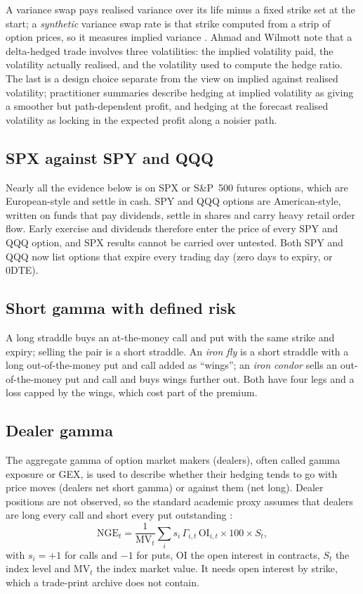 \documentclass[10pt, a4paper, twocolumn]{article}
\begin{document}
A variance swap pays realised variance over its life minus a fixed strike set at the start; a \emph{synthetic} variance swap rate is that strike computed from a strip of option prices, so it measures implied variance \cite{carrwu2009}. Ahmad and Wilmott \cite{ahmad2005} note that a delta-hedged trade involves three volatilities: the implied volatility paid, the volatility actually realised, and the volatility used to compute the hedge ratio. The last is a design choice separate from the view on implied against realised volatility; practitioner summaries describe hedging at implied volatility as giving a smoother but path-dependent profit, and hedging at the forecast realised volatility as locking in the expected profit along a noisier path.

\subsection{SPX against SPY and QQQ}

Nearly all the evidence below is on SPX or S\&P~500 futures options, which are European-style and settle in cash. SPY and QQQ options are American-style, written on funds that pay dividends, settle in shares and carry heavy retail order flow. Early exercise and dividends therefore enter the price of every SPY and QQQ option, and SPX results cannot be carried over untested. Both SPY and QQQ now list options that expire every trading day (zero days to expiry, or 0DTE).

\subsection{Short gamma with defined risk}

A long straddle buys an at-the-money call and put with the same strike and expiry; selling the pair is a short straddle. An \emph{iron fly} is a short straddle with a long out-of-the-money put and call added as ``wings''; an \emph{iron condor} sells an out-of-the-money put and call and buys wings further out. Both have four legs and a loss capped by the wings, which cost part of the premium.

\subsection{Dealer gamma}

The aggregate gamma of option market makers (dealers), often called gamma exposure or GEX, is used to describe whether their hedging tends to go with price moves (dealers net short gamma) or against them (net long). Dealer positions are not observed, so the standard academic proxy assumes that dealers are long every call and short every put outstanding \cite{baltussen2021}:
\begin{equation}
\mathrm{NGE}_t = \frac{1}{\mathrm{MV}_t}\sum_i s_i\,\Gamma_{i,t}\,\mathrm{OI}_{i,t}\times 100\times S_t ,
\label{eq:gex}
\end{equation}
with $s_i=+1$ for calls and $-1$ for puts, $\mathrm{OI}$ the open interest in contracts, $S_t$ the index level and $\mathrm{MV}_t$ the index market value. It needs open interest by strike, which a trade-print archive does not contain.
\end{document}
